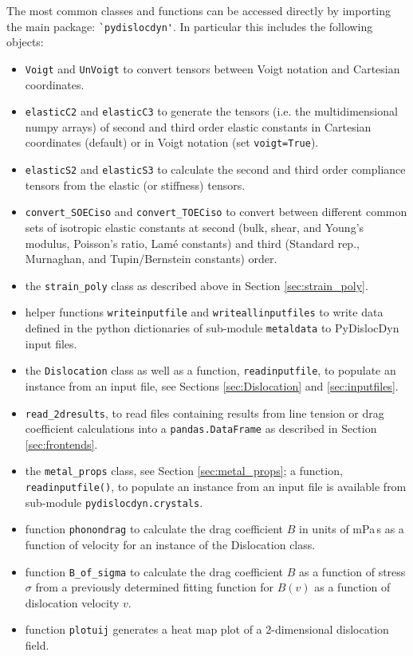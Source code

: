 \documentclass[11pt,letterpaper,oneside,pdftex]{article}
\begin{document}
The most common classes and functions can be accessed directly by importing the main package: \verb|`pydislocdyn'|.
In particular this includes the following objects:
\begin{itemize}
	\item \verb|Voigt| and \verb|UnVoigt| to convert tensors between Voigt notation and Cartesian coordinates.
	\item \verb|elasticC2| and \verb|elasticC3| to generate the tensors (i.e. the multidimensional numpy arrays) of second and third order elastic constants in Cartesian coordinates (default) or in Voigt notation (set \verb|voigt=True|).
	\item \verb|elasticS2| and \verb|elasticS3| to calculate the second and third order compliance tensors from the elastic (or stiffness) tensors.
	\item \verb|convert_SOECiso| and \verb|convert_TOECiso| to convert between different common sets of isotropic elastic constants at second (bulk, shear, and Young's modulus, Poisson's ratio, Lam\'e constants) and third (Standard rep., Murnaghan, and Tupin/Bernstein constants) order.
	\item the \verb|strain_poly| class as described above in Section \ref{sec:strain_poly}.
   \item helper functions \verb|writeinputfile| and \verb|writeallinputfiles|  to write data defined in the python dictionaries of sub-module \verb|metaldata| to PyDislocDyn input files.
   \item  the \verb|Dislocation| class as well as a function, \verb|readinputfile|, to populate an instance from an input file, see Sections \ref{sec:Dislocation} and \ref{sec:inputfiles}.
   \item \verb|read_2dresults|, to read files containing results from line tension or drag coefficient calculations into a \verb|pandas.DataFrame| as described in Section \ref{sec:frontends}.
   \item the \verb|metal_props| class, see Section \ref{sec:metal_props}; a function, \verb|readinputfile()|, to populate an instance from an input file is available from sub-module \verb|pydislocdyn.crystals|.
   \item function \verb|phonondrag| to calculate the drag coefficient $B$ in units of mPa\,s as a function of velocity for an instance of the Dislocation class.
   \item function \verb|B_of_sigma| to calculate the drag coefficient $B$ as a function of stress $\sigma$ from a previously determined fitting function for $B(v)$ as a function of dislocation velocity $v$.
   \item function \verb|plotuij| generates a heat map plot of a 2-dimensional dislocation field.
\end{itemize}
\end{document}
